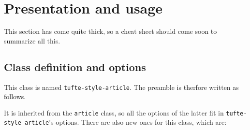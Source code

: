 \documentclass[
	raggedright,
	twoside,
	12pt,
	colorful,
]{tufte-style-article}
\begin{document}
\section{Presentation and usage}

This section has come quite thick, so a cheat sheet should come soon to summarize all this.

\subsection{Class definition and options}

This class is named \texttt{tufte-style-article}. The preamble is therfore written as follows.

It is inherited from the \texttt{article} class, so all the options of the latter fit in \texttt{tufte-style-article}'s options. There are also new ones for this class, which are:
\end{document}
